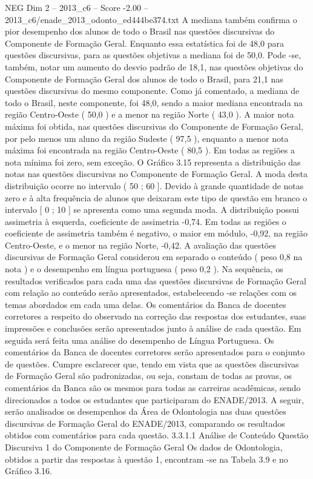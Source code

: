 \begin{textsample}{NEG Dim 2 – 2013\_c6 – Score -2.00 – 2013\_c6/enade\_2013\_odonto\_ed444be374.txt}
A mediana também confirma o pior desempenho dos alunos de todo o Brasil nas questões discursivas do Componente de Formação Geral.
Enquanto essa estatística foi de 48,0 para questões discursivas, para as questões objetivas a mediana foi de 50,0.
Pode -se, também, notar um aumento do desvio padrão de 18,1, nas questões objetivas do Componente de Formação Geral dos alunos de todo o Brasil, para 21,1 nas questões discursivas do mesmo componente.
Como já comentado, a mediana de todo o Brasil, neste componente, foi 48,0, sendo a maior mediana encontrada na região Centro-Oeste ( 50,0 ) e a menor na região Norte ( 43,0 ).
A maior nota máxima foi obtida, nas questões discursivas do Componente de Formação Geral, por pelo menos um aluno da região Sudeste ( 97,5 ), enquanto a menor nota máxima foi encontrada na região Centro-Oeste ( 80,5 ).
Em todas as regiões a nota mínima foi zero, sem exceção.
O Gráfico 3.15 representa a distribuição das notas nas questões discursivas no Componente de Formação Geral.
A moda desta distribuição ocorre no intervalo ( 50 ; 60 ].
Devido à grande quantidade de notas zero e à alta frequência de alunos que deixaram este tipo de questão em branco o intervalo [ 0 ; 10 ] se apresenta como uma segunda moda.
A distribuição possui assimetria à esquerda, coeficiente de assimetria -0,74.
Em todas as regiões o coeficiente de assimetria também é negativo, o maior em módulo, -0,92, na região Centro-Oeste, e o menor na região Norte, -0,42.
A avaliação das questões discursivas de Formação Geral considerou em separado o conteúdo ( peso 0,8 na nota ) e o desempenho em língua portuguesa ( peso 0,2 ).
Na sequência, os resultados verificados para cada uma das questões discursivas de Formação Geral com relação ao conteúdo serão apresentados, estabelecendo -se relações com os temas abordados em cada uma delas.
Os comentários da Banca de docentes corretores a respeito do observado na correção das respostas dos estudantes, suas impressões e conclusões serão apresentados junto à análise de cada questão.
Em seguida será feita uma análise do desempenho de Língua Portuguesa.
Os comentários da Banca de docentes corretores serão apresentados para o conjunto de questões.
Cumpre esclarecer que, tendo em vista que as questões discursivas de Formação Geral são padronizadas, ou seja, constam de todas as provas, os comentários da Banca são os mesmos para todas as carreiras acadêmicas, sendo direcionados a todos os estudantes que participaram do ENADE/2013.
A seguir, serão analisados os desempenhos da Área de Odontologia nas duas questões discursivas de Formação Geral do ENADE/2013, comparando os resultados obtidos com comentários para cada questão. 3.3.1.1 Análise de Conteúdo Questão Discursiva 1 do Componente de Formação Geral Os dados de Odontologia, obtidos a partir das respostas à questão 1, encontram -se na Tabela 3.9 e no Gráfico 3.16.

\end{textsample}
